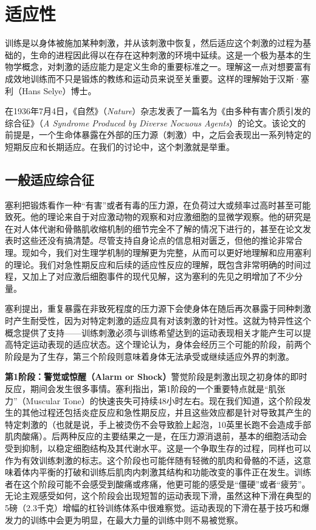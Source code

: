 \chapter{适应性}

训练是以身体被施加某种刺激，并从该刺激中恢复，然后适应这个刺激的过程为基础的，生命的进程因此得以在存在这种刺激的环境中延续。这是一个极为基本的生物学概念，对刺激的适应能力是定义生命的重要标准之一。理解这一点对想要富有成效地训练而不只是锻炼的教练和运动员来说至关重要。这样的理解始于汉斯·塞利（Hans Selye）博士。

在1936年7月4日，《自然》（\textit{Nature}）杂志发表了一篇名为《由多种有害介质引发的综合征》（\textit{A Syndrome Produced by Diverse Nocuous Agents}）的论文。该论文的前提是，一个生命体暴露在外部的压力源（刺激）中，之后会表现出一系列特定的短期反应和长期适应。在我们的讨论中，这个刺激就是举重。

\section{一般适应综合征}

塞利把锻炼看作一种“有害”或者有毒的压力源，在负荷过大或频率过高时甚至可能致死。他的理论来自于对应激动物的观察和对应激细胞的显微学观察。他的研究是在对人体代谢和骨骼肌收缩机制的细节完全不了解的情况下进行的，甚至在论文发表时这些还没有搞清楚。尽管支持自身论点的信息相对匮乏，但他的推论非常合理。现如今，我们对生理学机制的理解更为完整，从而可以更好地理解和应用塞利的理论。我们对急性期反应和后续的适应性反应的理解，既包含非常明确的时间过程，又加上了对应激后细胞事件的现代见解，这为塞利的先见之明增加了不少分量。

塞利提出，重复暴露在非致死程度的压力源下会使身体在随后再次暴露于同种刺激时产生耐受性，因为对特定刺激的适应具有对该刺激的针对性。这就为特异性这个概念提供了支持——训练刺激必须与训练希望达到的运动表现相关才能产生可以提高特定运动表现的适应状态。这个理论认为，身体会经历三个可能的阶段，前两个阶段是为了生存，第三个阶段则意味着身体无法承受或继续适应外界的刺激。

\textbf{第1阶段：警觉或惊醒（Alarm or Shock）}\quad 警觉阶段是刺激出现之初身体的即时反应，期间会发生很多事情。塞利指出，第1阶段的一个重要特点就是“肌张力”（Muscular Tone）的快速丧失可持续48小时左右。现在我们知道，这个阶段发生的其他过程还包括炎症反应和急性期反应，并且这些效应都是针对导致其产生的特定刺激的（也就是说，手上被烫伤不会导致脸上起泡，10英里长跑不会造成手部肌肉酸痛）。后两种反应的主要结果之一是，在压力源消退前，基本的细胞活动会受到抑制，以稳定细胞结构及其代谢水平。这是一个争取生存的过程，同样也可以作为有效训练刺激的标志。这个阶段也可能伴随有轻微的肌肉和骨骼的不适，这意味着体内平衡的打破和训练后肌肉内刺激其结构和功能改变的事件正在发生。训练者在这个阶段可能不会感受到酸痛或疼痛，他更可能的感受是“僵硬”或者“疲劳”。无论主观感受如何，这个阶段会出现短暂的运动表现下滑，虽然这种下滑在典型的5磅（2.3千克）增幅的杠铃训练体系中很难察觉。运动表现的下滑在基于技巧和爆发力的训练中会更为明显，在最大力量的训练中则不易被觉察。

